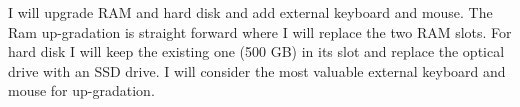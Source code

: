 I will upgrade RAM and hard disk and add external keyboard and mouse. The Ram up-gradation is straight forward where I will replace the two RAM slots. For hard disk I will keep the existing one (500 GB) in its slot and replace the optical drive with an SSD drive. I will consider the most valuable external keyboard and mouse for up-gradation.

